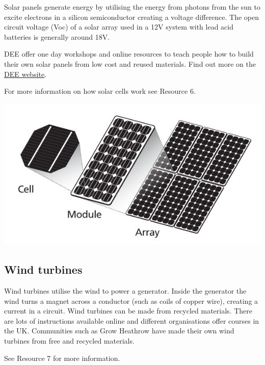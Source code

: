 \documentclass{article}
\theoremstyle{definition}
\theoremstyle{definition}
\theoremstyle{remark}
\begin{document}
    Solar panels generate energy by utilising the energy from photons from the sun to excite electrons in a silicon semiconductor creating a voltage difference. The open circuit voltage (Voc) of a solar array used in a 12V system with lead acid batteries is generally around 18V. 

    DEE offer one day workshops and online resources to teach people how to build their own solar panels from low cost and reused materials. Find out more on the \href{http://www.demandenergyequality.org/}{\underline{DEE website}}.

    For more information on how solar cells work see Resource 6.
    
    \begin{center}
      \includegraphics[width=0.45\paperwidth]{Images/image_4_1_(solar_breakdown).png}
    \end{center}
  

  {\color{blue}\subsection{Wind turbines}} %
  \label{sub:wind_turbines}

    Wind turbines utilise the wind to power a generator. Inside the generator the wind turns a magnet across a conductor (such as coils of copper wire), creating a current in a circuit. Wind turbines can be made from recycled materials. There are lots of instructions available online and different organisations offer courses in the UK. Communities such as Grow Heathrow have made their own wind turbines from free and recycled materials.

    See Resource 7 for more information.
  
\end{document}
